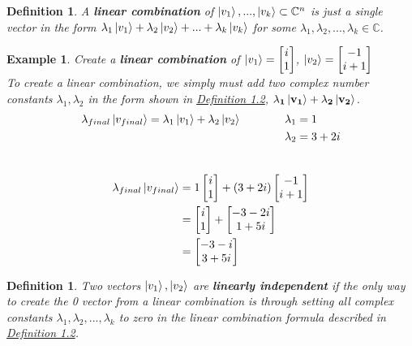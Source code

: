 \documentclass[12pt]{article}
\theoremstyle{plain}
\theoremstyle{nonumberplain}
\theoremstyle{plain}
\newtheorem{definition}[lemma]{Definition}
\newtheorem{example}[lemma]{Example}
\theoremstyle{nonumberplain}
\newcommand\1{{\bf 1}}
\newcommand{\bmat}[1]{\begin{bmatrix*} #1 \end{bmatrix*}} %
\newcommand{\C}{\mathbb{C}} %
\newcommand{\<}{\left\langle}
\renewcommand{\>}{\right\rangle}
\begin{document}
\begin{definition}
A \textbf{linear combination} of ${\ket{v_1}, ... , \ket{v_k}} \subset \C^n$ is just a single vector in the form $\lambda_1\ket{v_1} + \lambda_2\ket{v_2} + ... + \lambda_k\ket{v_k}$ for some $\lambda_1, \lambda_2, ..., \lambda_k  \in \C$.
\label{def:Combination}
\end{definition}


\begin{example}
Create a \textbf{linear combination} of $\ket{v_1} = \bmat{i\\1}$, $\ket{v_2} = \bmat{-1\\i + 1}$\\
To create a linear combination, we simply must add two complex number constants $\lambda_1, \lambda_2$ in the form shown in  \hyperref[def:Combination]{Definition 1.2}, $\mathbf{\lambda_1\ket{v_1} + \lambda_2\ket{v_2}}$. \\
\begin{equation*} 
\begin{split}
\lambda_{final}\ket{v_{final}} = \lambda_1\ket{v_1} + \lambda_2\ket{v_2} \qquad\qquad    
&\lambda_1 = 1\\
&\lambda_2 = 3 + 2i
\end{split}
\end{equation*}\\

\begin{equation}
\begin{split}
\lambda_{final}\ket{v_{final}} & = 1\bmat{i\\ 1} + (3 + 2i) \bmat{-1\\ i + 1}\\
& = \bmat{i\\ 1} + \bmat{-3 - 2i\\ 1 + 5i}\\
& = \bmat{-3 - i\\ 3 + 5i}
\end{split} 
\end{equation}
\end{example}

\begin{definition}
\label{def:Independence}
Two vectors $\ket{v_1}, \ket{v_2}$ are \textbf{linearly independent} if the only way to create the 0 vector from a linear combination is through setting all complex constants $\lambda_1, \lambda_2, ... , \lambda_k$ to zero in the linear combination formula described in \hyperref[def:Combination]{Definition 1.2}.
\end{definition}
\end{document}
